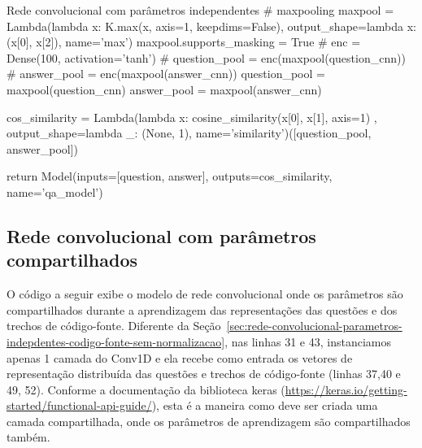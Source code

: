 \begin{mypython-linenumber}{Rede convolucional com parâmetros independentes}
        # maxpooling
        maxpool = Lambda(lambda x: K.max(x, axis=1, keepdims=False), output_shape=lambda x: (x[0], x[2]),
                         name='max')
        maxpool.supports_masking = True
        # enc = Dense(100, activation='tanh')
        # question_pool = enc(maxpool(question_cnn))
        # answer_pool = enc(maxpool(answer_cnn))
        question_pool = maxpool(question_cnn)
        answer_pool = maxpool(answer_cnn)

        cos_similarity = Lambda(lambda x: cosine_similarity(x[0], x[1], axis=1)
                                       , output_shape=lambda _: (None, 1), name='similarity')([question_pool,
                                                                                               answer_pool])

        return Model(inputs=[question, answer], outputs=cos_similarity,
                                   name='qa_model')
\end{mypython-linenumber}
\vspace{2cm}
\subsection{Rede convolucional com parâmetros compartilhados}

O código a seguir exibe o modelo de rede convolucional onde os parâmetros são compartilhados durante a aprendizagem das representações das questões e dos trechos de código-fonte. Diferente da Seção~\ref{sec:rede-convolucional-parametros-indepdentes-codigo-fonte-sem-normalizacao}, nas linhas 31 e 43, instanciamos apenas 1 camada do Conv1D e ela recebe como entrada os vetores de representação distribuída das questões e trechos de código-fonte (linhas 37,40 e 49, 52). Conforme a documentação da biblioteca \Gls{keras} (\url{https://keras.io/getting-started/functional-api-guide/}), esta é a maneira como deve ser criada uma camada compartilhada, onde os parâmetros de aprendizagem são compartilhados também.


